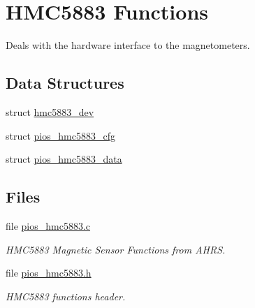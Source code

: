 \hypertarget{group___p_i_o_s___h_m_c5883}{\section{\-H\-M\-C5883 \-Functions}
\label{group___p_i_o_s___h_m_c5883}
}


\-Deals with the hardware interface to the magnetometers.  


\subsection*{\-Data \-Structures}
\begin{DoxyCompactItemize}
\item 
struct \hyperlink{structhmc5883__dev}{hmc5883\-\_\-dev}
\item 
struct \hyperlink{structpios__hmc5883__cfg}{pios\-\_\-hmc5883\-\_\-cfg}
\item 
struct \hyperlink{structpios__hmc5883__data}{pios\-\_\-hmc5883\-\_\-data}
\end{DoxyCompactItemize}
\subsection*{\-Files}
\begin{DoxyCompactItemize}
\item 
file \hyperlink{pios__hmc5883_8c}{pios\-\_\-hmc5883.\-c}
\begin{DoxyCompactList}\small\item\em \-H\-M\-C5883 \-Magnetic \-Sensor \-Functions from \-A\-H\-R\-S. \end{DoxyCompactList}\item 
file \hyperlink{pios__hmc5883_8h}{pios\-\_\-hmc5883.\-h}
\begin{DoxyCompactList}\small\item\em \-H\-M\-C5883 functions header. \end{DoxyCompactList}\end{DoxyCompactItemize}
